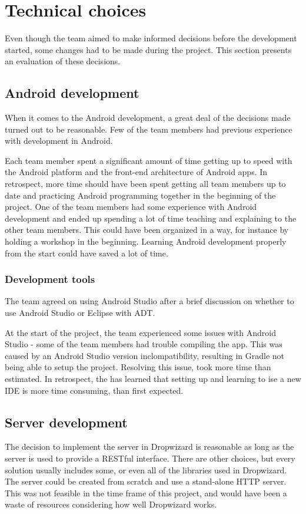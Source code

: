 \section{Technical choices}
Even though the team aimed to make informed decisions before the development started, some changes had to be made during the project. This section presents an evaluation of these decisions.

\subsection{Android development}
When it comes to the Android development, a great deal of the decisions made turned out to be reasonable. Few of the team members had previous experience with development in Android.

Each team member spent a significant amount of time getting up to speed with the Android platform and the front-end architecture of Android apps. In retrospect, more time should have been spent getting all team members up to date and practicing Android programming together in the beginning of the project. One of the team members had some experience with Android development and ended up spending a lot of time teaching and explaining to the other team members. This could have been organized in a way, for instance by holding a workshop in the beginning. Learning Android development properly from the start could have saved a lot of time.

\subsubsection{Development tools}
The team agreed on using Android Studio after a brief discussion on whether to use Android Studio or Eclipse with ADT.
 
At the start of the project, the team experienced some issues with Android Studio - some of the team members had trouble compiling the app. This was caused by an Android Studio version inclompatibility, resulting in Gradle not being able to setup the project. Resolving this issue, took more time than estimated. In retrospect, the has learned that setting up and learning to ise a new IDE is more time consuming, than first expected. 

\subsection{Server development}

The decision to implement the server in Dropwizard is reasonable as long as the server is used to provide a RESTful interface. There are other choices, but every solution usually includes some, or even all of the libraries used in Dropwizard. The server could be created from scratch and use a stand-alone HTTP server. This was not feasible in the time frame of this project, and would have been a waste of resources considering how well Dropwizard works.

